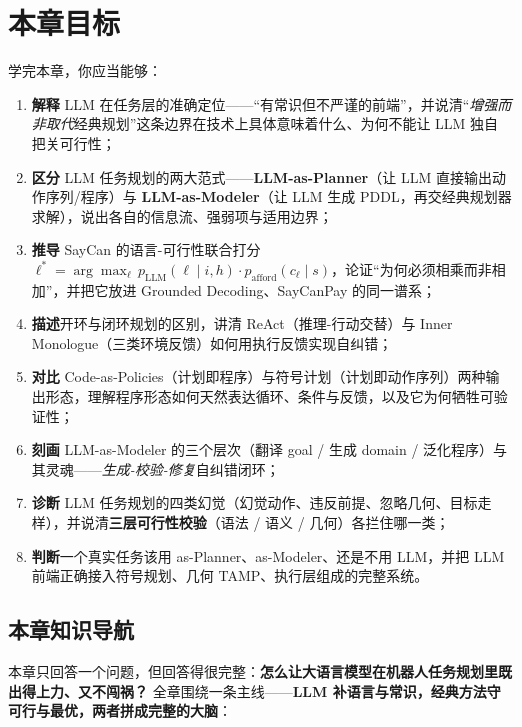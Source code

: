 \section*{本章目标}
学完本章，你应当能够：
\begin{enumerate}
  \item \textbf{解释} LLM 在任务层的准确定位——“有常识但不严谨的前端”，并说清“\emph{增强而非取代}经典规划”这条边界在技术上具体意味着什么、为何不能让 LLM 独自把关可行性；
  \item \textbf{区分} LLM 任务规划的两大范式——\textbf{LLM-as-Planner}（让 LLM 直接输出动作序列/程序）与 \textbf{LLM-as-Modeler}（让 LLM 生成 PDDL，再交经典规划器求解），说出各自的信息流、强弱项与适用边界；
  \item \textbf{推导} SayCan 的语言-可行性联合打分 $\ell^\ast=\arg\max_\ell\,p_{\text{LLM}}(\ell\mid i,h)\cdot p_{\text{afford}}(c_\ell\mid s)$，论证“为何必须相乘而非相加”，并把它放进 Grounded Decoding、SayCanPay 的同一谱系；
  \item \textbf{描述}开环与闭环规划的区别，讲清 ReAct（推理-行动交替）与 Inner Monologue（三类环境反馈）如何用执行反馈实现自纠错；
  \item \textbf{对比} Code-as-Policies（计划即程序）与符号计划（计划即动作序列）两种输出形态，理解程序形态如何天然表达循环、条件与反馈，以及它为何牺牲可验证性；
  \item \textbf{刻画} LLM-as-Modeler 的三个层次（翻译 goal / 生成 domain / 泛化程序）与其灵魂——\emph{生成-校验-修复}自纠错闭环；
  \item \textbf{诊断} LLM 任务规划的四类幻觉（幻觉动作、违反前提、忽略几何、目标走样），并说清\textbf{三层可行性校验}（语法 / 语义 / 几何）各拦住哪一类；
  \item \textbf{判断}一个真实任务该用 as-Planner、as-Modeler、还是不用 LLM，并把 LLM 前端正确接入符号规划、几何 TAMP、执行层组成的完整系统。
\end{enumerate}

\subsection*{本章知识导航}
本章只回答一个问题，但回答得很完整：\textbf{怎么让大语言模型在机器人任务规划里既出得上力、又不闯祸？} 全章围绕一条主线——\textbf{LLM 补语言与常识，经典方法守可行与最优，两者拼成完整的大脑}：

